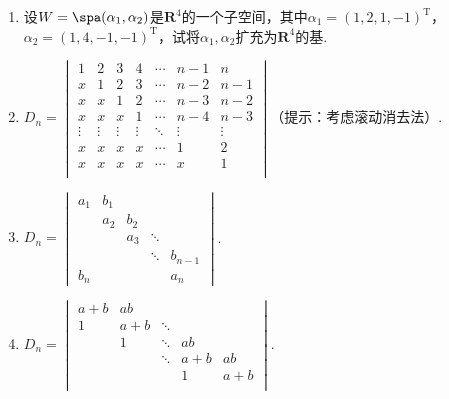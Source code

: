 \begin{enumerate}
    \item 设$W=\spa(\alpha_1,\alpha_2)$是$\mathbf{R}^4$的一个子空间，其中$\alpha_1=(1,2,1,-1)^\mathrm{T}$，$\alpha_2=(1,4,-1,-1)^\mathrm{T}$，试将$\alpha_1,\alpha_2$扩充为$\mathbf{R}^4$的基.

    \item $ D_n=\begin{vmatrix}
                  1      & 2      & 3      & 4      & \cdots & n-1    & n      \\
                  x      & 1      & 2      & 3      & \cdots & n-2    & n-1    \\
                  x      & x      & 1      & 2      & \cdots & n-3    & n-2    \\
                  x      & x      & x      & 1      & \cdots & n-4    & n-3    \\
                  \vdots & \vdots & \vdots & \vdots & \ddots & \vdots & \vdots \\
                  x      & x      & x      & x      & \cdots & 1      & 2      \\
                  x      & x      & x      & x      & \cdots & x      & 1      \\
              \end{vmatrix}$（提示：考虑滚动消去法）.

    \item $ D_n=\begin{vmatrix}
                  a_1 & b_1 &     &        &         \\
                      & a_2 & b_2 &        &         \\
                      &     & a_3 & \ddots &         \\
                      &     &     & \ddots & b_{n-1} \\
                  b_n &     &     &        & a_n
              \end{vmatrix}$.

    \item $D_n=\begin{vmatrix}
                  a+b & ab  &        &     &     \\
                  1   & a+b & \ddots &     &     \\
                      & 1   & \ddots & ab  &     \\
                      &     & \ddots & a+b & ab  \\
                      &     &        & 1   & a+b \\
              \end{vmatrix}$.


\end{enumerate}
